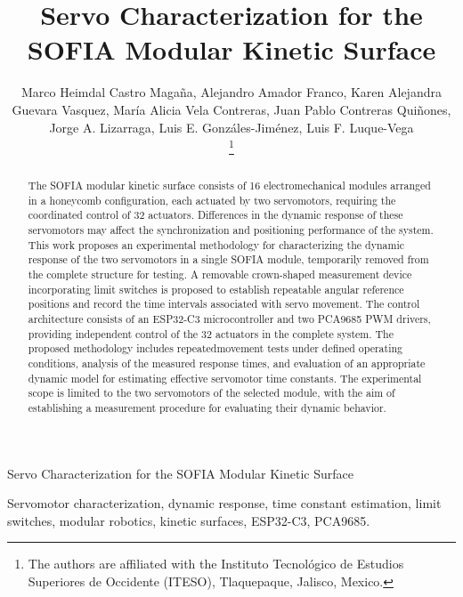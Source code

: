 \documentclass[lettersize,journal]{IEEEtran}
\begin{document}
	\title{Servo Characterization for the SOFIA Modular Kinetic
		Surface}
	
	\author{
		Marco Heimdal Castro Magaña, Alejandro Amador Franco, Karen Alejandra Guevara Vasquez, María Alicia Vela Contreras, Juan Pablo Contreras Quiñones,
		Jorge A. Lizarraga, Luis E. Gonzáles-Jiménez, Luis F. Luque-Vega
		
	\thanks{The authors are affiliated with the Instituto Tecnológico de Estudios Superiores de Occidente (ITESO), Tlaquepaque, Jalisco, Mexico.}
	}
	
	
	{Servo Characterization for the SOFIA Modular Kinetic
		Surface}
	
	\maketitle
	
	
	\begin{abstract}
		The SOFIA modular kinetic surface consists of 16 electromechanical modules arranged in a honeycomb configuration, each actuated by two servomotors, requiring the coordinated control of 32 actuators. Differences in the dynamic response of these servomotors may affect the synchronization and positioning performance of the system. This work proposes an experimental methodology for characterizing the dynamic response of the two servomotors in a single SOFIA module, temporarily removed from the complete structure for testing. A removable crown-shaped measurement device incorporating limit switches is proposed to establish repeatable angular reference positions and record the time intervals associated with servo movement. The control architecture consists of an ESP32-C3 microcontroller and two PCA9685 PWM drivers, providing independent control of the 32 actuators in the complete system. The proposed methodology includes repeatedmovement tests under defined operating conditions, analysis of the measured response times, and evaluation of an appropriate dynamic model for
		estimating effective servomotor time constants. The experimental scope is limited to the two servomotors of the selected module, with the aim of establishing a measurement procedure for evaluating their dynamic behavior.
	\end{abstract}
	
	\begin{IEEEkeywords}
		Servomotor characterization, dynamic response, time constant estimation, limit switches, modular robotics, kinetic surfaces, ESP32-C3, PCA9685.
	\end{IEEEkeywords}
	
\end{document}
